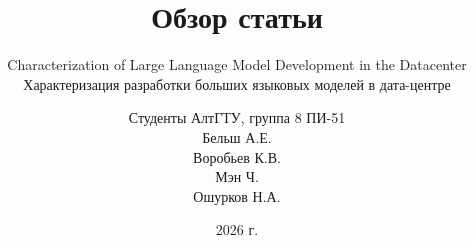 \documentclass{beamer}
\title{Обзор статьи}
\subtitle{Characterization of Large Language Model Development in the Datacenter\\
	Характеризация разработки больших языковых моделей в дата-центре}
\author{
	Студенты АлтГТУ, группа 8 ПИ-51\\
	Бельш А.Е.\\
	Воробьев К.В.\\
	Мэн Ч.\\
	Ошурков Н.А.
}
\date{2026 г.}
\begin{document}
	
	\frame{\titlepage}
	
	
	
	
	
	
	
	
	
	
\end{document}
